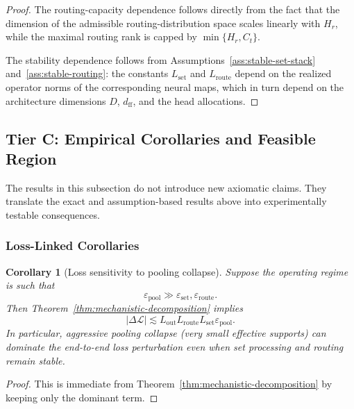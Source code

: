 \documentclass{article}
\theoremstyle{plain}
\newtheorem{corollary}[theorem]{Corollary}
\theoremstyle{definition}
\theoremstyle{remark}
\begin{document}
\begin{proof}
The routing-capacity dependence follows directly from the fact that the dimension of the admissible routing-distribution space scales linearly with $H_r$, while the maximal routing rank is capped by $\min\{H_r,C_{t}\}$.

The stability dependence follows from Assumptions~\ref{ass:stable-set-stack} and~\ref{ass:stable-routing}: the constants $L_{\mathrm{set}}$ and $L_{\mathrm{route}}$ depend on the realized operator norms of the corresponding neural maps, which in turn depend on the architecture dimensions $D$, $d_{\mathrm{ff}}$, and the head allocations.
\end{proof}

\subsection{Tier C: Empirical Corollaries and Feasible Region}
\label{sec:tier-c}

The results in this subsection do not introduce new axiomatic claims. They translate the exact and assumption-based results above into experimentally testable consequences.

\subsubsection{Loss-Linked Corollaries}
\label{sec:tier-c-loss}

\begin{corollary}[Loss sensitivity to pooling collapse]
\label{cor:loss-sensitivity-pooling}
Suppose the operating regime is such that
\[
\varepsilon_{\mathrm{pool}} \gg \varepsilon_{\mathrm{set}},\varepsilon_{\mathrm{route}}.
\]
Then Theorem~\ref{thm:mechanistic-decomposition} implies
\begin{equation}
\label{eq:loss-pooling-dominance}
|\Delta \mathcal{L}|
\lesssim
L_{\mathrm{out}}L_{\mathrm{route}}L_{\mathrm{set}}
\varepsilon_{\mathrm{pool}}.
\end{equation}
In particular, aggressive pooling collapse (very small effective supports) can dominate the end-to-end loss perturbation even when set processing and routing remain stable.
\end{corollary}

\begin{proof}
This is immediate from Theorem~\ref{thm:mechanistic-decomposition} by keeping only the dominant term.
\end{proof}
\end{document}
